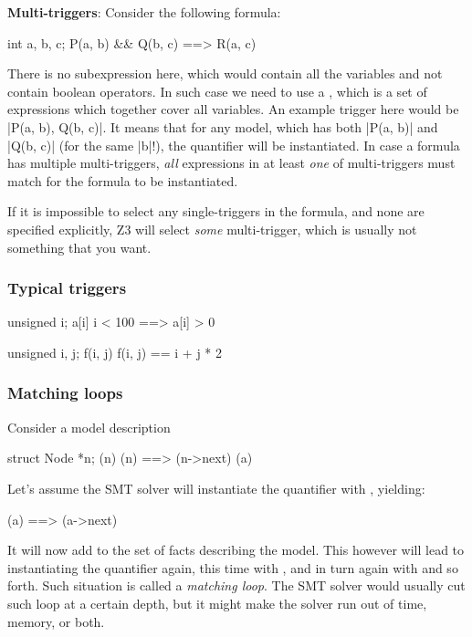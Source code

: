 \begin{note}
\textbf{Multi-triggers}:
Consider the following formula:
\begin{VCC}
\forall int a, b, c; P(a, b) && Q(b, c) ==> R(a, c)
\end{VCC}
There is no subexpression here, which would contain all the variables
and not contain boolean operators.
In such case we need to use a , which
is a set of expressions which together cover all variables.
An example trigger here would be \vcc|{P(a, b), Q(b, c)}|.
It means that for any model, which has both \vcc|P(a, b)|
and \vcc|Q(b, c)| (for the same \vcc|b|!), the quantifier
will be instantiated.
In case a formula has multiple multi-triggers, \emph{all}
expressions in at least \emph{one} of multi-triggers
must match for the formula to be instantiated.

If it is impossible to select any single-triggers in the formula,
and none are specified explicitly, Z3 will select \emph{some}
multi-trigger, which is usually not something that you want.
\end{note}


\subsubsection{Typical triggers}


\begin{VCC}
\forall unsigned i; {a[i]} i < 100 ==> a[i] > 0
\end{VCC}

\begin{VCC}
\forall unsigned i, j; {f(i, j)} f(i, j) == i + j * 2
\end{VCC}

\subsubsection{Matching loops}

Consider a model description
\begin{VCC}
\forall struct Node *n; {\mine(n)} \mine(n) ==> \mine(n->next)
\mine(a)
\end{VCC}
Let's assume the SMT solver will instantiate the quantifier with , yielding:
\begin{VCC}
\mine(a) ==> \mine(a->next)
\end{VCC}
It will now add  to the set of facts
describing the model.
This however will lead to instantiating the quantifier again,
this time with , and in turn again with
 and so forth.
Such situation is called a \emph{matching loop}.
The SMT solver would usually cut such loop at a certain depth,
but it might make the solver run out of time, memory, or both.

